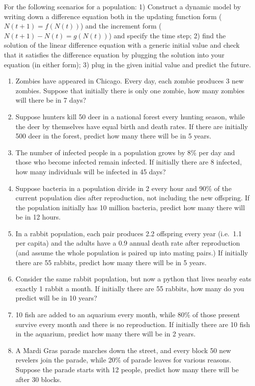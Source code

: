 \documentclass[
]{book}
\theoremstyle{definition}
\theoremstyle{definition}
\theoremstyle{definition}
\theoremstyle{remark}
\begin{document}
For the following scenarios for a population: 1) Construct a dynamic model by writing down a difference equation both in the updating function form (\(N(t+1) = f(N(t))\)) and the increment form (\(N(t+1) - N(t) = g(N(t))\)) and specify the time step; 2) find the solution of the linear difference equation with a generic initial value and check that it satisfies the difference equation by plugging the solution into your equation (in either form); 3) plug in the given initial value and predict the future.

\begin{enumerate}
\def\labelenumi{\arabic{enumi}.}
\item
  Zombies have appeared in Chicago. Every day, each zombie produces 3 new zombies. Suppose that initially there is only one zombie, how many zombies will there be in 7 days?
\item
  Suppose hunters kill 50 deer in a national forest every hunting season, while the deer by themselves have equal birth and death rates. If there are initially 500 deer in the forest, predict how many there will be in 5 years.
\item
  The number of infected people in a population grows by 8\% per day and those who become infected remain infected. If initially there are 8 infected, how many individuals will be infected in 45 days?
\item
  Suppose bacteria in a population divide in 2 every hour and 90\% of the current population dies after reproduction, not including the new offspring. If the population initially has 10 million bacteria, predict how many there will be in 12 hours.
\item
  In a rabbit population, each pair produces 2.2 offspring every year (i.e.~1.1 per capita) and the adults have a 0.9 annual death rate after reproduction (and assume the whole population is paired up into mating pairs.) If initially there are 55 rabbits, predict how many there will be in 5 years.
\item
  Consider the same rabbit population, but now a python that lives nearby eats exactly 1 rabbit a month. If initially there are 55 rabbits, how many do you predict will be in 10 years?
\item
  10 fish are added to an aquarium every month, while 80\% of those present survive every month and there is no reproduction. If initially there are 10 fish in the aquarium, predict how many there will be in 2 years.
\item
  A Mardi Gras parade marches down the street, and every block 50 new revelers join the parade, while 20\% of parade leaves for various reasons. Suppose the parade starts with 12 people, predict how many there will be after 30 blocks.

\end{enumerate}
\end{document}
